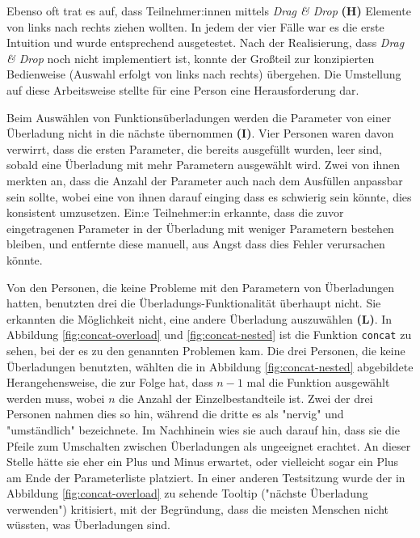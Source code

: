Ebenso oft trat es auf, dass Teilnehmer:innen mittels \textit{Drag \& Drop} \textbf{(H)} Elemente von links nach rechts ziehen wollten. In jedem der vier Fälle war es die erste Intuition und wurde entsprechend ausgetestet. Nach der Realisierung, dass \textit{Drag \& Drop} noch nicht implementiert ist, konnte der Großteil zur konzipierten Bedienweise (Auswahl erfolgt von links nach rechts) übergehen. Die Umstellung auf diese Arbeitsweise stellte für eine Person eine Herausforderung dar.

Beim Auswählen von Funktionsüberladungen werden die Parameter von einer Überladung nicht in die nächste übernommen \textbf{(I)}. Vier Personen waren davon verwirrt, dass die ersten Parameter, die bereits ausgefüllt wurden, leer sind, sobald eine Überladung mit mehr Parametern ausgewählt wird. Zwei von ihnen merkten an, dass die Anzahl der Parameter auch nach dem Ausfüllen anpassbar sein sollte, wobei eine von ihnen darauf einging dass es schwierig sein könnte, dies konsistent umzusetzen. Ein:e Teilnehmer:in erkannte, dass die zuvor eingetragenen Parameter in der Überladung mit weniger Parametern bestehen bleiben, und entfernte diese manuell, aus Angst dass dies Fehler verursachen könnte.

Von den Personen, die keine Probleme mit den Parametern von Überladungen hatten, benutzten drei die Überladungs-Funktionalität überhaupt nicht. Sie erkannten die Möglichkeit nicht, eine andere Überladung auszuwählen \textbf{(L)}. In Abbildung \ref{fig:concat-overload} und \ref{fig:concat-nested} ist die Funktion \texttt{concat} zu sehen, bei der es zu den genannten Problemen kam. Die drei Personen, die keine Überladungen benutzten, wählten die in Abbildung \ref{fig:concat-nested} abgebildete Herangehensweise, die zur Folge hat, dass $n-1$ mal die Funktion ausgewählt werden muss, wobei $n$ die Anzahl der Einzelbestandteile ist. Zwei der drei Personen nahmen dies so hin, während die dritte es als "nervig" und "umständlich" bezeichnete. Im Nachhinein wies sie auch darauf hin, dass sie die Pfeile zum Umschalten zwischen Überladungen als ungeeignet erachtet. An dieser Stelle hätte sie eher ein Plus und Minus erwartet, oder vielleicht sogar ein Plus am Ende der Parameterliste platziert. In einer anderen Testsitzung wurde der in Abbildung \ref{fig:concat-overload} zu sehende Tooltip ("nächste Überladung verwenden") kritisiert, mit der Begründung, dass die meisten Menschen nicht wüssten, was Überladungen sind.

